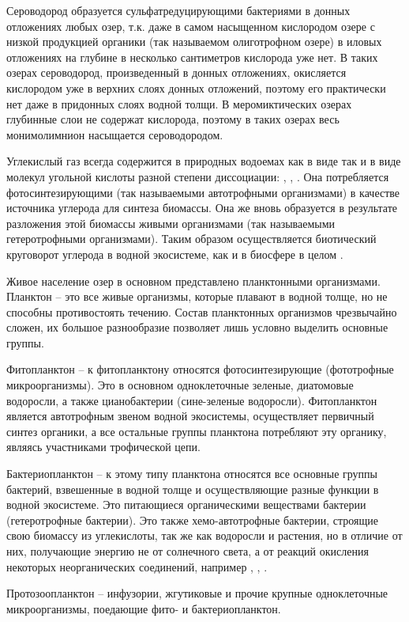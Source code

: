 Сероводород образуется сульфатредуцирующими бактериями в донных отложениях любых озер, т.к. даже в самом насыщенном кислородом озере с низкой продукцией органики
(так называемом олиготрофном озере) в иловых отложениях на глубине в несколько сантиметров кислорода уже нет. В таких озерах сероводород, произведенный в донных отложениях, окисляется кислородом уже в верхних слоях донных отложений, поэтому его практически
нет даже в придонных слоях водной толщи. В меромиктических озерах глубинные слои не
содержат кислорода, поэтому в таких озерах весь монимолимнион насыщается сероводородом.

Углекислый газ всегда содержится в природных водоемах как в виде 
так и в виде
молекул угольной кислоты разной степени диссоциации: ,  ,  .
 Она потребляется фотосинтезирующими (так называемыми автотрофными организмами) в качестве
источника углерода для синтеза биомассы. Она же вновь образуется в результате разложения этой биомассы живыми организмами (так называемыми гетеротрофными организмами).
Таким образом осуществляется биотический круговорот углерода в водной экосистеме, как
и в биосфере в целом \cite{BioPhys10}.

Живое население озер в основном представлено планктонными организмами. Планктон –
это все живые организмы, которые плавают в водной толще, но не способны противостоять
течению. Состав планктонных организмов чрезвычайно сложен, их большое разнообразие
позволяет лишь условно выделить основные группы.

Фитопланктон – к фитопланктону относятся фотосинтезирующие (фототрофные микроорганизмы). Это в основном одноклеточные зеленые, диатомовые водоросли, а также цианобактерии (сине-зеленые водоросли). Фитопланктон является автотрофным звеном водной
экосистемы, осуществляет первичный синтез органики, а все остальные группы планктона
потребляют эту органику, являясь участниками трофической цепи.

Бактериопланктон – к этому типу планктона относятся все основные группы бактерий,
взвешенные в водной толще и осуществляющие разные функции в водной экосистеме.
Это питающиеся органическими веществами бактерии (гетеротрофные бактерии). Это также
хемо-автотрофные бактерии, строящие свою биомассу из углекислоты, так же как водоросли
и растения, но в отличие от них, получающие энергию не от солнечного света, а от реакций
окисления некоторых неорганических соединений, например ,  , .

Протозоопланктон – инфузории, жгутиковые и прочие крупные одноклеточные микроорганизмы, поедающие фито- и бактериопланктон.

